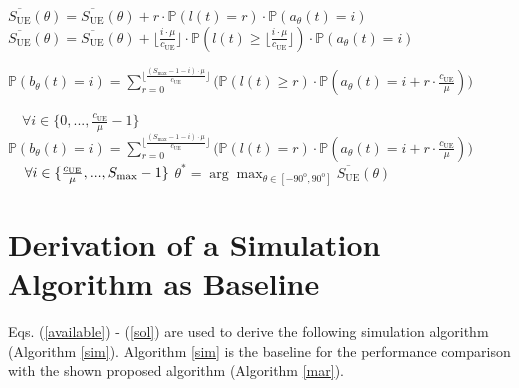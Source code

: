 \begin{breakablealgorithm}
\begin{algorithmic} [1]
		\item[]
		\State {}
    \State $\overline{S_{\mathrm{UE}}}(\theta)=\overline{S_{\mathrm{UE}}}(\theta)+ r \cdot \mathbb{P}(l(t)=r) \cdot \mathbb{P}(a_\theta(t)=i) $ \label{hi1}
       \EndFor
   \State      $\overline{S_{\mathrm{UE}}}(\theta)=\overline{S_{\mathrm{UE}}}(\theta)+ \lfloor \frac{i \cdot \mu}{c_{\mathrm{UE}}} \rfloor \cdot \mathbb{P}(l(t)\geq \lfloor \frac{i\cdot \mu}{c_{\mathrm{UE}}} \rfloor ) \cdot \mathbb{P}(a_\theta(t)=i) $\label{hi2}   
       \EndFor 
		\item[]
			\State {} \label{con1} 
			\State $\mathbb{P}(b_\theta(t)=i)=\sum_{r=0}^{ \Big\lfloor \frac{(S_{\mathrm{max}}-1-i)\cdot \mu}{c_{\mathrm{UE}}} \Big\rfloor } \Big(  \mathbb{P}(l(t)\geq r) \cdot \mathbb{P}(a_\theta(t)=i +r \cdot \frac{c_{\mathrm{UE}}}{\mu})\Big) $\label{c21}  
			
		\State $	\quad \forall i \in \{0,...,\frac{c_{\mathrm{UE}}}{\mu}-1\}$ \label{c22}  
    \State $\mathbb{P}(b_\theta(t)=i)=\sum_{r=0}^{ \Big\lfloor \frac{(S_{\mathrm{max}}-1-i)\cdot \mu}{c_{\mathrm{UE}}} \Big\rfloor }  \Big( \mathbb{P}(l(t)=r)  \cdot\mathbb{P}(a_\theta(t)=i +r \cdot \frac{c_{\mathrm{UE}}}{\mu})\Big)$\label{c11}  
	\State 	$\quad \enskip\!\! \forall i \in \{\frac{c_{\mathrm{UE}}}{\mu},...,S_{\mathrm{max}}-1\}$ \label{c12}  
\EndFor
\EndFor
\Return $\theta^*=\arg \displaystyle\max_{\theta\in[-90^{\mathrm{o}},90^{\mathrm{o}}]} \overline{S_{\mathrm{UE}}}(\theta)$
\end{algorithmic}
\end{breakablealgorithm}




\section{Derivation of a Simulation Algorithm as Baseline \label{see}}

Eqs. (\ref{available}) - (\ref{sol}) are used to derive the following simulation algorithm (Algorithm \ref{sim}). Algorithm \ref{sim} is the baseline for the performance comparison with the shown proposed algorithm (Algorithm \ref{mar}).


 



